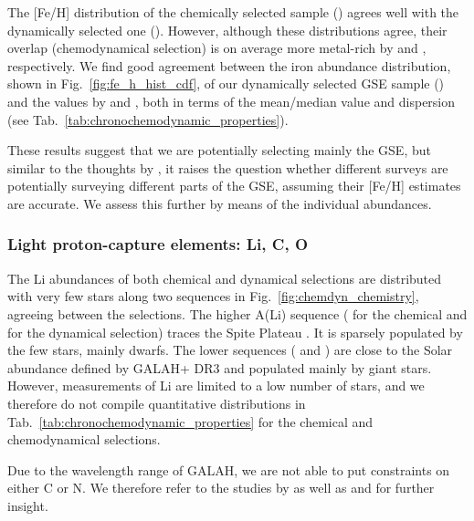 \documentclass[fleqn,usenatbib]{mnras}
\begin{document}
The [Fe/H] distribution of the chemically selected sample () agrees well with the dynamically selected one (). However, although these distributions agree, their overlap (chemodynamical selection) is on average more metal-rich by  and , respectively. We find good agreement between the iron abundance distribution, shown in Fig.~\ref{fig:fe_h_hist_cdf}, of our dynamically selected GSE sample () and the values by \citet{Naidu2020} and \citet{Feuillet2021}, both in terms of the mean/median value and dispersion (see Tab.~\ref{tab:chronochemodynamic_properties}).

These results suggest that we are potentially selecting mainly the GSE, but similar to the thoughts by \citet{Bonifacio2021}, it raises the question whether different surveys are potentially surveying different parts of the GSE, assuming their [Fe/H] estimates are accurate. We assess this further by means of the individual abundances.

\subsubsection{Light proton-capture elements: Li, C, O}

The Li abundances of both chemical and dynamical selections are distributed with very few stars along two sequences in Fig.~\ref{fig:chemdyn_chemistry}, agreeing between the selections. The higher A(Li) sequence ( for the chemical and  for the dynamical selection) traces the Spite Plateau \citep{Spite1982}. It is sparsely populated by the few stars, mainly dwarfs. The lower sequences ( and ) are close to the Solar abundance defined by GALAH+ DR3 \citep{Buder2021} and populated mainly by giant stars. However, measurements of Li are limited to a low number of stars, and we therefore do not compile quantitative distributions in Tab.~\ref{tab:chronochemodynamic_properties} for the chemical and chemodynamical selections. 

Due to the wavelength range of GALAH, we are not able to put constraints on either C or N. We therefore refer to the studies by \citet{Nissen2014} as well as \citet{Hawkins2015} and \citet{Hayes2018} for further insight.
\end{document}
